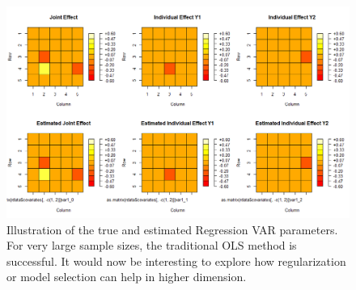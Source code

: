 \begin{itemize}
	\begin{figure}
		\centering
		\includegraphics[width = \linewidth]{figures/2_VisRvarTrueEstPars}
		\caption{Illustration of the true and estimated Regression VAR parameters. For very large sample sizes, the traditional OLS method is successful. It would now be interesting to explore how regularization or model selection can help in higher dimension.}\label{fig:rvar_TrueEstimatedPars}
	\end{figure}
	

\end{itemize}
